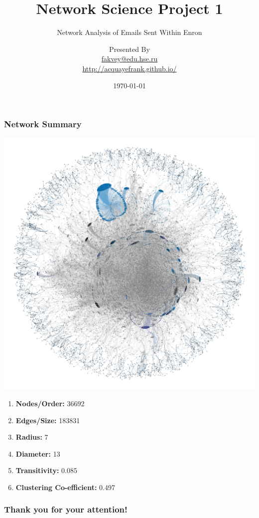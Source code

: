 \documentclass{beamer}
\title[Short title]{Network Science Project 1}
\subtitle{ Network Analysis of Emails Sent Within Enron}
\author[Frank Acquaye]{Presented By \\ \smallskip \scriptsize \url{fakvey@edu.hse.ru}\\\url{http://acquayefrank.github.io/}}
\institute[Higher School of Economics]{National Research University \\ Higher School of Economics (Moscow)}
\date{\today}
\begin{document}

\frame[plain]{\titlepage}	%


\begin{frame}
\frametitle{Network Summary}
	\begin{multicols}{2}
		\includegraphics[width=\columnwidth]{na-ee-graph-final.png}
		\columnbreak

		\begin{enumerate} 
			\item \textbf{Nodes/Order:} 36692
			\item \textbf{Edges/Size:} 183831
			\item \textbf{Radius:} 7
			\item \textbf{Diameter:} 13		
			\item \textbf{Transitivity:}  0.085
			\item \textbf{Clustering Co-efficient:} 0.497
		\end{enumerate} 
	\end{multicols}
\end{frame}



\begin{frame}[c]
\begin{center}
\frametitle{\LARGE Thank you for your attention!}

{\LARGE \inserttitle}

\bigskip

{\insertauthor} 

\bigskip\bigskip

{\insertinstitute}

\bigskip\bigskip

{\large \insertdate}
\end{center}
\end{frame}
\end{document}
